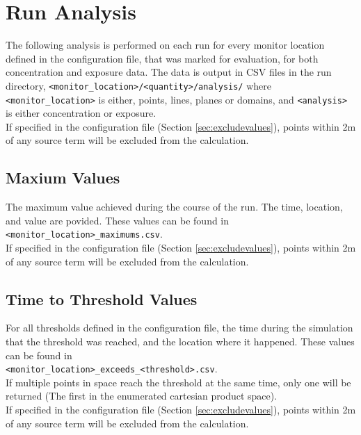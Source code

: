 \documentclass[]{article}
\def\code#1{\texttt{#1}}
\begin{document}
\section{Run Analysis}\label{sec:analysis}
The following analysis is performed on each run for every monitor location
defined in the configuration file, that was marked for evaluation, for both
concentration and exposure data. The data is output in CSV files in the run
directory, \code{<monitor\_location>/<quantity>/analysis/} where
\code{<monitor\_location>} is either, points, lines, planes or domains, and
\code{<analysis>} is either concentration or exposure.\\

If specified in the configuration file (Section \ref{sec:excludevalues}), points
within 2m of any source term will be excluded from the calculation.

\subsection{Maxium Values}
The maximum value achieved during the course of the run. The time, location, and
value are povided. These values can be found in\\

\code{<monitor\_location>\_maximums.csv}. \\

If specified in the configuration file (Section \ref{sec:excludevalues}), points
within 2m of any source term will be excluded from the calculation.

\subsection{Time to Threshold Values}
For all thresholds defined in the configuration file, the time during the
simulation that the threshold was reached, and the location where it happened.
These values can be found in \\

\code{<monitor\_location>\_exceeds\_<threshold>.csv}.\\

If multiple points in space reach the threshold at the same time, only one will
be returned (The first in the enumerated cartesian product space).\\

If specified in the configuration file (Section \ref{sec:excludevalues}), points
within 2m of any source term will be excluded from the calculation.
\end{document}
